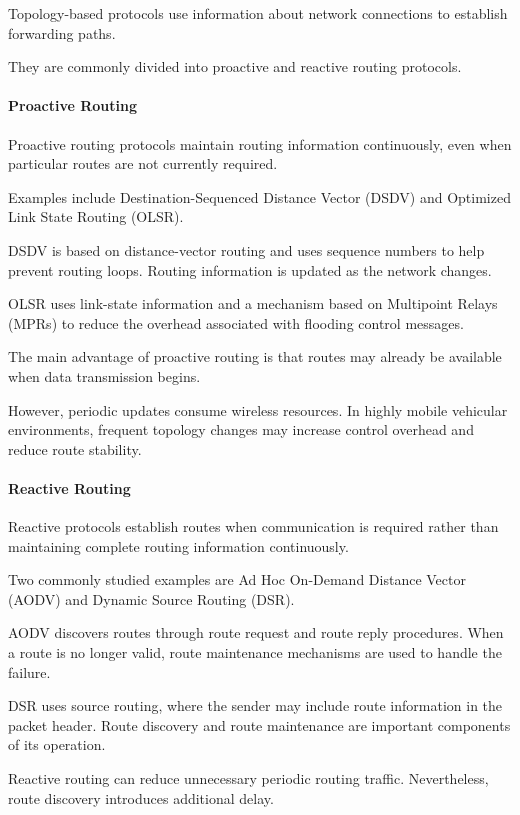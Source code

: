 Topology-based protocols
use information about
network connections
to establish forwarding paths.

They are commonly divided
into proactive and reactive
routing protocols.

\paragraph{Proactive Routing}

Proactive routing protocols
maintain routing information
continuously, even when
particular routes are not
currently required.

Examples include
Destination-Sequenced
Distance Vector (DSDV)
and Optimized Link State
Routing (OLSR).

DSDV is based on
distance-vector routing
and uses sequence numbers
to help prevent routing loops.
Routing information is
updated as the network changes.

OLSR uses link-state
information and a mechanism
based on Multipoint Relays
(MPRs) to reduce the
overhead associated with
flooding control messages.

The main advantage of
proactive routing is that
routes may already be
available when data
transmission begins.

However, periodic updates
consume wireless resources.
In highly mobile vehicular
environments, frequent
topology changes may
increase control overhead
and reduce route stability.

\paragraph{Reactive Routing}

Reactive protocols establish
routes when communication
is required rather than
maintaining complete routing
information continuously.

Two commonly studied examples
are Ad Hoc On-Demand Distance
Vector (AODV) and Dynamic
Source Routing (DSR).

AODV discovers routes
through route request
and route reply procedures.
When a route is no longer
valid, route maintenance
mechanisms are used to
handle the failure.

DSR uses source routing,
where the sender may
include route information
in the packet header.
Route discovery and
route maintenance are
important components
of its operation.

Reactive routing can
reduce unnecessary
periodic routing traffic.
Nevertheless, route
discovery introduces
additional delay.

